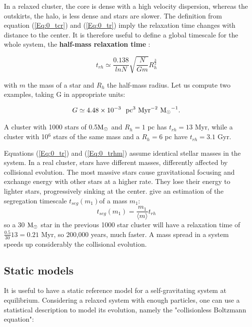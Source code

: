 In a relaxed cluster, the core is dense with a high velocity dispersion, whereas the outskirts, the halo, is less dense and stars are slower. The definition from equation (\ref{Eq:0_tcr}) and (\ref{Eq:0_tr}) imply the relaxation time changes with distance to the center. It is therefore useful to define a global timescale for the whole system, the \textbf{half-mass relaxation time} \cite{Heggie2003}:


\begin{equation}
\label{Eq:0_trhm}
t_{rh} \simeq   \frac{0.138}{ln N} \sqrt{ \frac{N}{G m}} R_h^\frac{3}{2}
\end{equation}

with $m$ the mass of a star and $R_h$ the half-mass radius. Let us compute two examples, taking G in appropriate units:

\begin{equation}
G \simeq 4.48 \times 10^{-3}~~ \textrm{pc}^3 ~\textrm{Myr}^{-2} ~{\textrm{M}_\odot}^{-1}.
\end{equation}

A cluster with 1000 stars of 0.5${\textrm{M}_\odot}$ and $R_{h} = 1$ pc has $t_{rh} = 13$ Myr, while a cluster with 10$^6$ stars of the same mass and a $R_{h} = 6$ pc have $t_{rh} = 3.1$ Gyr.


Equations (\ref{Eq:0_tr}) and (\ref{Eq:0_trhm}) assume identical stellar masses in the system. In a real cluster, stars have different masses, differently affected by collisional evolution. The most massive stars cause gravitational focusing and exchange energy with other stars at a higher rate. They lose their energy to lighter stars, progressively sinking at the center. \cite{Heggie2003} give an estimation of the segregation timescale $t_{seg}(m_1)$of a mass $m_1$:
\begin{equation}
t_{seg}(m_1) = \frac{m_1}{\langle m \rangle} t_{rh}
\end{equation} 
so a 30 ${\textrm{M}_\odot}$ star in the previous 1000 star cluster will have a relaxation time of $\frac{0.5}{30} 13 = 0.21$ Myr, so 200,000 years, much faster. A mass spread in a system speeds up considerably the collisional evolution.



\subsection{Static models}

It is useful to have a static reference model for a self-gravitating system at equilibrium. Considering a relaxed system with enough particles, one can use a statistical description to model its evolution, namely the "collisionless Boltzmann equation":


